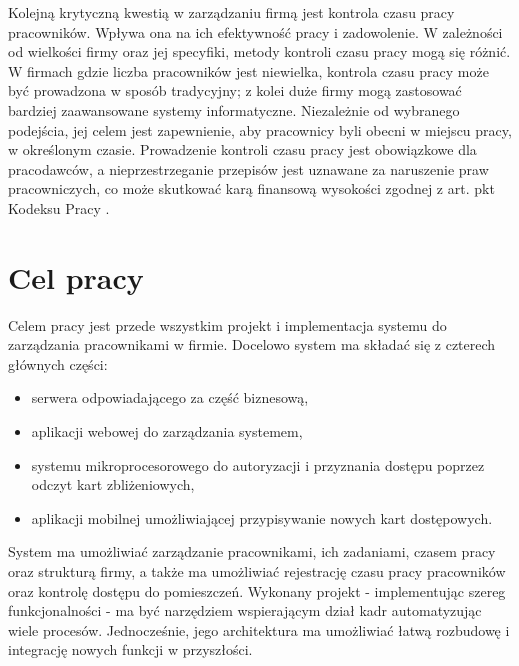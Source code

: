 Kolejną krytyczną kwestią w zarządzaniu firmą jest kontrola czasu pracy pracowników. Wpływa ona na ich efektywność pracy i zadowolenie. W zależności od wielkości firmy oraz jej specyfiki, metody kontroli czasu pracy mogą się różnić. W firmach gdzie liczba pracowników jest niewielka, kontrola czasu pracy może być prowadzona w sposób tradycyjny; z kolei duże firmy mogą zastosować bardziej zaawansowane systemy informatyczne. Niezależnie od wybranego podejścia, jej celem jest zapewnienie, aby pracownicy byli obecni w miejscu pracy, w określonym czasie. Prowadzenie kontroli czasu pracy jest obowiązkowe dla pracodawców, a nieprzestrzeganie przepisów jest uznawane za naruszenie praw pracowniczych, co może skutkować karą finansową wysokości zgodnej z art.  pkt  Kodeksu Pracy \cite{bib:KodeksPracy}.

\section{Cel pracy}



Celem pracy jest przede wszystkim projekt i implementacja systemu do zarządzania pracownikami w firmie. Docelowo system ma składać się z czterech głównych części:

\begin{itemize}
    \item serwera odpowiadającego za część biznesową,
    \item aplikacji webowej do zarządzania systemem,
    \item systemu mikroprocesorowego do autoryzacji i przyznania dostępu poprzez odczyt kart zbliżeniowych,
    \item aplikacji mobilnej umożliwiającej przypisywanie nowych kart dostępowych.
\end{itemize}

System ma umożliwiać zarządzanie pracownikami, ich zadaniami, czasem pracy oraz strukturą firmy, a także ma umożliwiać rejestrację czasu pracy pracowników oraz kontrolę dostępu do pomieszczeń. Wykonany projekt - implementując szereg funkcjonalności - ma być narzędziem wspierającym dział kadr automatyzując wiele procesów. Jednocześnie, jego architektura ma umożliwiać łatwą rozbudowę i integrację nowych funkcji w przyszłości.

